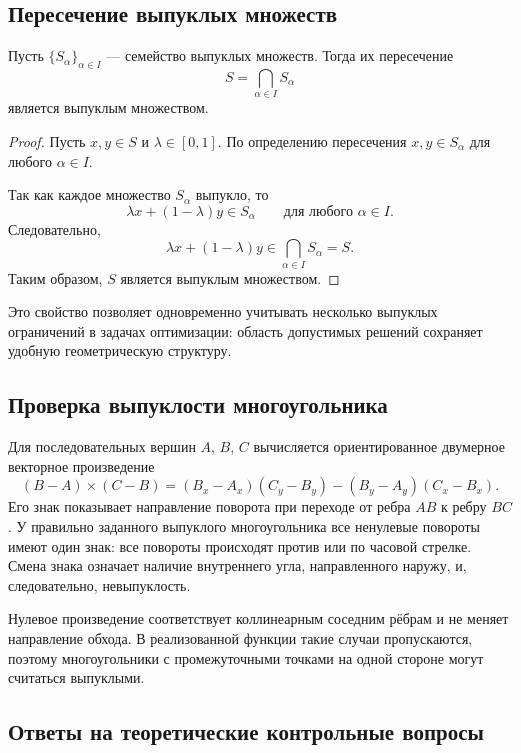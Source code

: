 \subsection{Пересечение выпуклых множеств}

\begin{theorem}
\label{thm:intersection}
Пусть $\{S_\alpha\}_{\alpha\in I}$ --- семейство выпуклых множеств.
Тогда их пересечение
\[
    S=\bigcap_{\alpha\in I} S_\alpha
\]
является выпуклым множеством.
\end{theorem}

\begin{proof}
Пусть $x,y\in S$ и $\lambda\in[0,1]$. По определению пересечения
$x,y\in S_\alpha$ для любого $\alpha\in I$.

Так как каждое множество $S_\alpha$ выпукло, то
\[
    \lambda x+(1-\lambda)y\in S_\alpha
    \qquad \text{для любого } \alpha\in I.
\]
Следовательно,
\[
    \lambda x+(1-\lambda)y
    \in \bigcap_{\alpha\in I}S_\alpha=S.
\]
Таким образом, $S$ является выпуклым множеством.
\end{proof}

Это свойство позволяет одновременно учитывать несколько выпуклых ограничений в задачах оптимизации: область допустимых решений сохраняет удобную геометрическую структуру.

\subsection{Проверка выпуклости многоугольника}

Для последовательных вершин $A$, $B$, $C$ вычисляется ориентированное двумерное векторное произведение
\[
	(B-A)\times(C-B)=(B_x-A_x)(C_y-B_y)-(B_y-A_y)(C_x-B_x).
\]
Его знак показывает направление поворота при переходе от ребра $AB$ к
ребру $BC$. У правильно заданного выпуклого многоугольника все
ненулевые повороты имеют один знак: все повороты происходят против или
по часовой стрелке. Смена знака означает наличие
внутреннего угла, направленного наружу, и, следовательно,
невыпуклость.

Нулевое произведение соответствует коллинеарным соседним рёбрам и не меняет направление обхода. В реализованной функции такие случаи пропускаются, поэтому многоугольники с промежуточными точками на одной стороне могут считаться выпуклыми.

\subsection{Ответы на теоретические контрольные вопросы}

